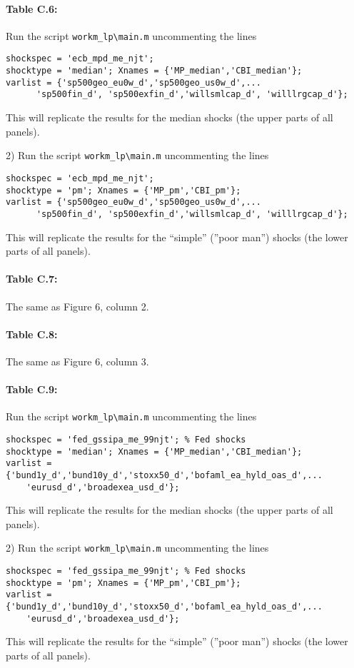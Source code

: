 \documentclass[12pt]{article}
\begin{document}
\paragraph{Table C.6:} 
Run the script
\verb|workm_lp\main.m| uncommenting the lines
\begin{verbatim}
shockspec = 'ecb_mpd_me_njt';
shocktype = 'median'; Xnames = {'MP_median','CBI_median'};
varlist = {'sp500geo_eu0w_d','sp500geo_us0w_d',...
      'sp500fin_d', 'sp500exfin_d','willsmlcap_d', 'willlrgcap_d'};
\end{verbatim}
This will replicate the results for the median shocks (the upper parts of all panels).

2) Run the script
\verb|workm_lp\main.m| uncommenting the lines
\begin{verbatim}
shockspec = 'ecb_mpd_me_njt';
shocktype = 'pm'; Xnames = {'MP_pm','CBI_pm'};
varlist = {'sp500geo_eu0w_d','sp500geo_us0w_d',...
      'sp500fin_d', 'sp500exfin_d','willsmlcap_d', 'willlrgcap_d'};
\end{verbatim}
This will replicate the results for the ``simple'' (''poor man'') shocks (the lower parts of all panels).

\paragraph{Table C.7:} The same as Figure 6, column 2.

\paragraph{Table C.8:} The same as Figure 6, column 3.

\paragraph{Table C.9:} 
Run the script
\verb|workm_lp\main.m| uncommenting the lines
\begin{verbatim}
shockspec = 'fed_gssipa_me_99njt'; % Fed shocks
shocktype = 'median'; Xnames = {'MP_median','CBI_median'};
varlist = {'bund1y_d','bund10y_d','stoxx50_d','bofaml_ea_hyld_oas_d',...
    'eurusd_d','broadexea_usd_d'};
\end{verbatim}
This will replicate the results for the median shocks (the upper parts of all panels).

2) Run the script
\verb|workm_lp\main.m| uncommenting the lines
\begin{verbatim}
shockspec = 'fed_gssipa_me_99njt'; % Fed shocks
shocktype = 'pm'; Xnames = {'MP_pm','CBI_pm'};
varlist = {'bund1y_d','bund10y_d','stoxx50_d','bofaml_ea_hyld_oas_d',...
    'eurusd_d','broadexea_usd_d'};
\end{verbatim}
This will replicate the results for the ``simple'' (''poor man'') shocks (the lower parts of all panels).
\end{document}
